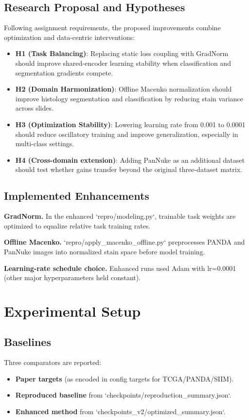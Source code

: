 \documentclass[conference]{IEEEtran}
\begin{document}
\subsection{Research Proposal and Hypotheses}
Following assignment requirements, the proposed improvements combine optimization and data-centric interventions:
\begin{itemize}
\item \textbf{H1 (Task Balancing)}: Replacing static loss coupling with GradNorm should improve shared-encoder learning stability when classification and segmentation gradients compete.
\item \textbf{H2 (Domain Harmonization)}: Offline Macenko normalization should improve histology segmentation and classification by reducing stain variance across slides.
\item \textbf{H3 (Optimization Stability)}: Lowering learning rate from 0.001 to 0.0001 should reduce oscillatory training and improve generalization, especially in multi-class settings.
\item \textbf{H4 (Cross-domain extension)}: Adding PanNuke as an additional dataset should test whether gains transfer beyond the original three-dataset matrix.
\end{itemize}

\subsection{Implemented Enhancements}
\textbf{GradNorm.} In the enhanced `repro/modeling.py`, trainable task weights are optimized to equalize relative task training rates. 

\textbf{Offline Macenko.} `repro/apply\_macenko\_offline.py` preprocesses PANDA and PanNuke images into normalized stain space before model training. 

\textbf{Learning-rate schedule choice.} Enhanced runs used Adam with lr=0.0001 (other major hyperparameters held constant).

\section{Experimental Setup}
\subsection{Baselines}
Three comparators are reported:
\begin{itemize}
\item \textbf{Paper targets} (as encoded in config targets for TCGA/PANDA/SIIM).
\item \textbf{Reproduced baseline} from `checkpoints/reproduction\_summary.json`.
\item \textbf{Enhanced method} from `checkpoints\_v2/optimized\_summary.json`.
\end{itemize}
\end{document}
